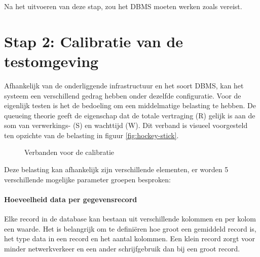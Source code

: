 Na het uitvoeren van deze stap, zou het DBMS moeten werken zoals vereist. 

\section{Stap 2: Calibratie van de testomgeving}
Afhankelijk van de onderliggende infrastructuur en het soort DBMS, kan het systeem een verschillend gedrag hebben onder dezelfde configuratie. Voor de eigenlijk testen is het de bedoeling om een middelmatige belasting te hebben. De queueing theorie geeft de eigenschap dat de totale vertraging (R) gelijk is aan de som van verwerkings- (S) en wachttijd (W)\cite{millsap2003optimizing}. Dit verband is visueel voorgesteld ten opzichte van de belasting in figuur \ref{fig:hockey-stick}. 

\begin{figure}[ht!] 
\centering
	\hfill
	\caption{Verbanden voor de calibratie}
\end{figure}
Deze belasting kan afhankelijk zijn verschillende elementen, er worden 5 verschillende mogelijke parameter groepen besproken:

\paragraph{Hoeveelheid data per gegevensrecord} Elke record in de database kan bestaan uit verschillende kolommen en per kolom een waarde. Het is belangrijk om te definiëren hoe groot een gemiddeld record is, het type data in een record en het aantal kolommen. Een klein record zorgt voor minder netwerkverkeer en een ander schrijfgebruik dan bij een groot record. 

